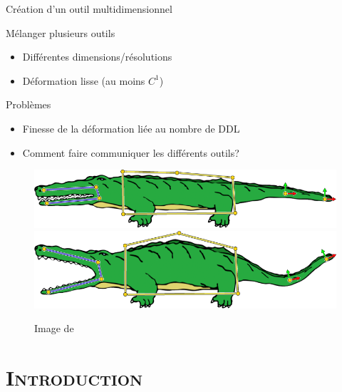 \documentclass[xcolor=x11names,compress]{beamer}
\renewcommand{\(}{\begin{columns}} \renewcommand{\)}{\end{columns}}
\newcommand{\<}[1]{\begin{column}{#1}} \renewcommand{\>}{\end{column}}
\begin{document}
\begin{frame}{Création d'un outil multidimensionnel}
  \begin{block}{Mélanger plusieurs outils}
    \begin{itemize}
    \item Différentes dimensions/résolutions
    \item Déformation lisse (au moins $C^1$)
    \end{itemize}
  \end{block}
  \begin{alertblock}{Problèmes}
    \begin{itemize}
    \item Finesse de la déformation liée au nombre de DDL
    \item Comment faire communiquer les différents outils?
    \end{itemize}
  \end{alertblock}
  \begin{figure}[h]
    \begin{center}
      \includegraphics[scale=0.15]{alligator-avant.png}
      \includegraphics[scale=0.15]{alligator-apres.png}
    \end{center}
    \caption{Image de \cite{JBPS11}}
  \end{figure}
\end{frame}


\section{\scshape Introduction}
\end{document}
